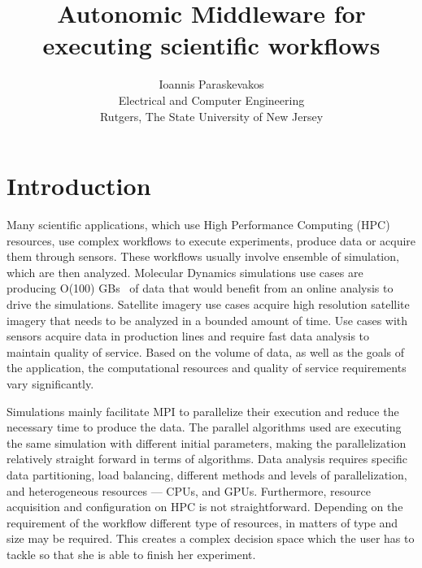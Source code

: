 

\title{Autonomic Middleware for executing scientific workflows}
\author{Ioannis Paraskevakos \\	Electrical and Computer Engineering \\Rutgers, The State University of New Jersey}


\maketitle



\section{Introduction}
Many scientific applications, which use High Performance Computing (HPC) resources, use complex workflows to execute experiments, produce data or acquire them through sensors. These workflows usually involve ensemble of simulation, which are then analyzed. Molecular Dynamics simulations use cases are producing O(100) GBs~\cite{cheatham2015impact} of data that would benefit from an online analysis to drive the simulations. Satellite imagery use cases acquire high resolution satellite imagery that needs to be analyzed in a bounded amount of time. Use cases with sensors acquire data in production lines and require fast data analysis to maintain quality of service. Based on the volume of data, as well as the goals of the application, the computational resources and quality of service requirements vary significantly. 


Simulations mainly facilitate MPI to parallelize their execution and reduce the necessary time to produce the data. The parallel algorithms used are executing the same simulation with different initial parameters, making the parallelization relatively straight forward in terms of algorithms. Data analysis requires specific data partitioning, load balancing, different methods and levels of parallelization, and heterogeneous resources --- CPUs, and GPUs. Furthermore, resource acquisition and configuration on HPC is not straightforward. Depending on the requirement of the workflow different type of resources, in matters of type and size may be required. This creates a complex decision space which the user has to tackle so that she is able to finish her experiment.

